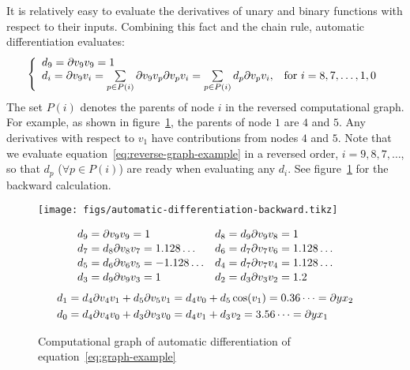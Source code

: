 It is relatively easy to evaluate the derivatives of unary and binary functions with respect to their inputs.
Combining this fact and the chain rule, automatic differentiation evaluates:
\begin{equation}\label{eq:reverse-graph-example}
    \left\{
        \begin{array}{ll}
            d_9 = \pdiff{v_9}{v_9} = 1 & \\
            d_i = \pdiff{v_9}{v_i}
                = \sum\limits_{p\in P(i)}\pdiff{v_9}{v_p}\pdiff{v_p}{v_i}
                = \sum\limits_{p\in P(i)}d_p\pdiff{v_p}{v_i}, & \text{for }i=8, 7, \ldots, 1, 0
        \end{array}
    \right.
\end{equation}
The set $P(i)$ denotes the parents of node $i$ in the reversed computational graph.
For example, as shown in figure~\ref{fig:automatic-differentiation-backward}, the parents of node $1$ are $4$ and $5$.
Any derivatives with respect to $v_1$ have contributions from nodes $4$ and $5$.
Note that we evaluate equation~\ref{eq:reverse-graph-example} in a reversed order, $i=9, 8, 7, \ldots$, so that $d_p$ ($\forall p\in P(i)$) are ready when evaluating any $d_i$.
See figure~\ref{fig:automatic-differentiation-backward} for the backward calculation.

\begin{figure}[hbt!]
    \begin{minipage}{0.4\textwidth}
        \texttt{[image: figs/automatic-differentiation-backward.tikz]}
    \end{minipage}%
    \begin{minipage}{0.5\textwidth}
        \scriptsize
        \singlespacing
        \begin{equation*}
            \begin{aligned}
                d_9& = \pdiff{v_9}{v_9} = 1 & d_8& = d_9 \pdiff{v_9}{v_8} = 1 \\[-2pt]
                d_7& = d_8 \pdiff{v_8}{v_7} = 1.128\dots & d_6& = d_7 \pdiff{v_7}{v_6} = 1.128\dots \\[-2pt]
                d_5& = d_6 \pdiff{v_6}{v_5} = -1.128\dots & d_4& = d_7 \pdiff{v_7}{v_4} = 1.128\dots \\[-2pt]
                d_3& = d_9 \pdiff{v_9}{v_3} = 1 & d_2& = d_3 \pdiff{v_3}{v_2} = 1.2
            \end{aligned}
        \end{equation*}%
        \begin{equation*}
            \begin{aligned}
                d_1& = d_4 \pdiff{v_4}{v_1} + d_5 \pdiff{v_5}{v_1} = d_4v_0 + d_5\cos(v_1) = 0.36\dots = \pdiff{y}{x_2} \\
                d_0& = d_4 \pdiff{v_4}{v_0} + d_3 \pdiff{v_3}{v_0} = d_4v_1+d_3v_2 = 3.56\dots = \pdiff{y}{x_1}
            \end{aligned}
        \end{equation*}
    \end{minipage}
    \caption{Computational graph of automatic differentiation of equation~\ref{eq:graph-example}}%
    \label{fig:automatic-differentiation-backward}
\end{figure}

